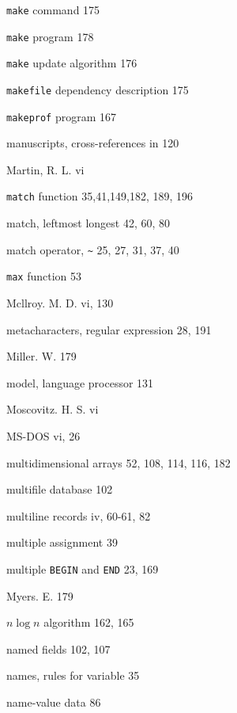 \begin{multicols}{3}
\hangindent=3pc  \verb'make' command 175

\hangindent=3pc  \verb'make' program 178

\hangindent=3pc  \verb'make' update algorithm 176

\hangindent=3pc  \verb'makefile' dependency description 175

\hangindent=3pc  \verb'makeprof' program 167

\hangindent=3pc  manuscripts, cross-references in 120

\hangindent=3pc  Martin, R. L. vi

\hangindent=3pc  \verb'match' function 35,41,149,182, 189, 196

\hangindent=3pc  match, leftmost longest 42, 60, 80

\hangindent=3pc  match operator, \verb'~' 25, 27, 31, 37, 40

\hangindent=3pc  \verb'max' function 53

\hangindent=3pc  Mcllroy. M. D. vi, 130

\hangindent=3pc  metacharacters, regular expression 28, 191

\hangindent=3pc  Miller. W. 179

\hangindent=3pc  model, language processor 131

\hangindent=3pc  Moscovitz. H. S. vi

\hangindent=3pc  MS-DOS vi, 26

\hangindent=3pc  multidimensional arrays 52, 108, 114, 116, 182

\hangindent=3pc  multifile database 102

\hangindent=3pc  multiline records iv, 60-61, 82

\hangindent=3pc  multiple assignment 39

\hangindent=3pc  multiple \verb'BEGIN' and \verb'END' 23, 169

\hangindent=3pc  Myers. E. 179

\hangindent=3pc  $n \log n$ algorithm 162, 165

\hangindent=3pc  named fields 102, 107

\hangindent=3pc  names, rules for variable 35

\hangindent=3pc  name-value data 86


\end{multicols}
